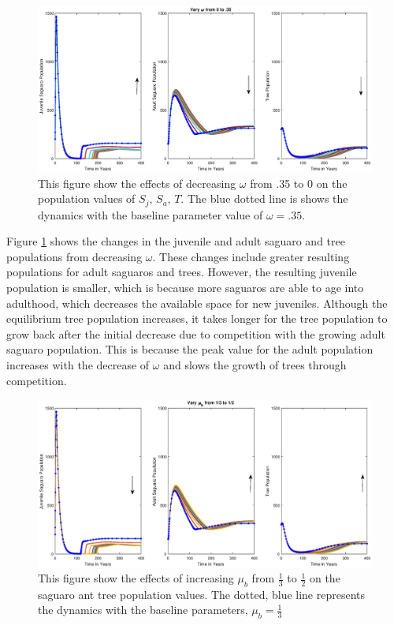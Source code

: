 \documentclass[a4paper]{article}
\begin{document}
\begin{figure}[H]
\hspace{-2cm}
\includegraphics[scale = 0.55]{VaryOmegaWbuffel.eps}
\caption{This figure show the effects of decreasing $\omega$ from .35 to 0 on the population values of $S_j$, $S_a$, $T$. The blue dotted line is shows the dynamics with the baseline parameter value of $\omega = .35$.}
\label{fig:VaryOmega}
\end{figure}
Figure \ref{fig:VaryOmega} shows the changes in the juvenile and adult saguaro and tree populations from decreasing $\omega$. These changes include greater resulting populations for adult saguaros and trees. However, the resulting juvenile population is smaller, which is because more saguaros are able to age into adulthood, which decreases the available space for new juveniles. Although the equilibrium tree population increases, it takes longer for the tree population to grow back after the initial decrease due to competition with the growing adult saguaro population. This is because the peak value for the adult population increases with the decrease of $\omega$ and slows the growth of trees through competition. 

\begin{figure}[H]
\hspace{-1.5 cm}
\includegraphics[scale = 0.5]{VaryMubWbuffel.eps}
\caption{This figure show the effects of increasing $\mu_b$ from $\frac{1}{3}$ to $\frac{1}{2}$ on the saguaro ant tree population values. The dotted, blue line represents the dynamics with the baseline parameters, $\mu_b = \frac{1}{3}$}
\label{fig:VaryMub}
\end{figure}
\end{document}
